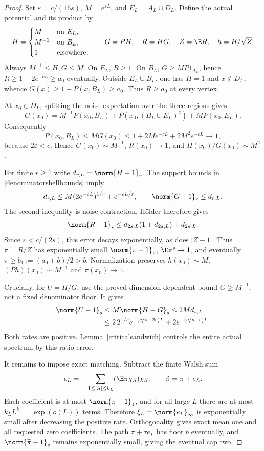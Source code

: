 \begin{proof}
Set $\varepsilon=c/(16s)$, $M=e^{\varepsilon L}$, and $E_L=A_L\cup D_L$.
Define the actual potential and its product by
\[
 H=\begin{cases}M&\text{on }E_L,\\M^{-1}&\text{on }B_L,\\1&\text{elsewhere},\end{cases}
 \qquad G=PH,\quad R=HG,\quad Z=\E R,\quad h=H/\sqrt Z.
\]
Always $M^{-1}\leq H,G\leq M$. On $E_L$, $R\geq1$. On $B_L$,
$G\geq MP1_{A_L}$, hence $R\geq1-2e^{-cL}\geq a_0$ eventually.
Outside $E_L\cup B_L$, one has $H=1$ and $x\notin D_L$, whence
$G(x)\geq1-P(x,B_L)\geq a_0$. Thus $R\geq a_0$ at every vertex.

At $x_0\in D_L$, splitting the noise expectation over the three
regions gives
\[
 G(x_0)=M^{-1}P(x_0,B_L)+P(x_0,(B_L\cup E_L)^c)+MP(x_0,E_L).
\]
Consequently
\[
 P(x_0,B_L)\leq MG(x_0)
       \leq1+2Me^{-cL}+2M^2e^{-cL}\longrightarrow1,
\]
because $2\varepsilon<c$. Hence $G(x_0)\sim M^{-1}$,
$R(x_0)\to1$, and $H(x_0)/G(x_0)\sim M^2$.

For finite $r\geq1$ write $d_{r,L}=\norm{H-1}_r$. The support
bounds in \eqref{denominatorshellbounds} imply
\[
 d_{r,L}\leq M(2e^{-cL})^{1/r}+e^{-cL/r},\qquad
 \norm{G-1}_r\leq d_{r,L}.
\]
The second inequality is noise contraction. H\"older therefore gives
\[
 \norm{R-1}_s\leq d_{2s,L}(1+d_{2s,L})+d_{2s,L}.
\]
Since $\varepsilon<c/(2s)$, this error decays exponentially, as does
$|Z-1|$. Thus $\pi=R/Z$ has exponentially small $\norm{\pi-1}_s$,
$\E\pi^s\to1$, and eventually $\pi\geq b_1:=(a_0+b)/2>b$.
Normalization preserves $h(x_0)\sim M$, $(Ph)(x_0)\sim M^{-1}$
and $\pi(x_0)\to1$.

Crucially, for $U=H/G$, use the proved dimension-dependent bound
$G\geq M^{-1}$, not a fixed denominator floor. It gives
\begin{align}
 \norm{U-1}_s&\leq M\norm{H-G}_s\leq2M d_{s,L}\nonumber\\
 &\leq2\,2^{1/s}e^{-(c/s-2\varepsilon)L}
          +2e^{-(c/s-\varepsilon)L}.\label{vanishingdenominatorratio}
\end{align}
Both rates are positive. Lemma~\ref{criticalsandwich} controls the
entire actual spectrum by this ratio error.

It remains to impose exact matching. Subtract the finite Walsh sum
\[
 e_L=-\sum_{1\leq|S|\leq k_L}(\E\pi\chi_S)\chi_S,
 \qquad \widetilde\pi=\pi+e_L.
\]
Each coefficient is at most $\norm{\pi-1}_1$, and for all large $L$
there are at most $k_LL^{k_L}=\exp(o(L))$ terms. Therefore
$\xi_L=\norm{e_L}_\infty$ is exponentially small after decreasing
the positive rate. Orthogonality gives exact mean one and all requested
zero coefficients. The path $\pi+\tau e_L$ has floor $b$ eventually,
and $\norm{\widetilde\pi-1}_s$ remains exponentially small, giving
the eventual cap two.


\end{proof}

